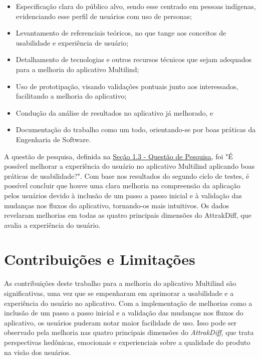     \begin{itemize}
              \item Especificação clara do público alvo, sendo esse centrado em pessoas indígenas, evidenciando esse perfil de usuários com uso de personas;

              \item Levantamento de referenciais teóricos, no que tange aos conceitos de usabilidade e experiência de usuário;

              \item Detalhamento de tecnologias e outros recursos técnicos que sejam adequados para a melhoria do aplicativo Multilind;

              \item Uso de prototipação, visando validações pontuais junto aos interessados, facilitando a melhoria do aplicativo;

              \item Condução da análise de resultados no aplicativo já melhorado, e
              
              \item Documentação do trabalho como um todo, orientando-se por boas práticas da Engenharia de Software.
    \end{itemize}

A questão de pesquisa, definida na \hyperref[sec:QuestaodePesquisa]{Seção 1.3 - Questão de Pesquisa}, foi "É possível melhorar a experiência do usuário no aplicativo 
Multilind aplicando boas práticas de usabilidade?". Com base nos resultados do segundo ciclo de testes, é possível concluir que houve uma clara melhoria na compreensão da aplicação 
pelos usuários devido à inclusão de um passo a passo inicial e à validação das mudanças nos fluxos do aplicativo, tornando-os mais intuitivos. Os dados revelaram melhorias em todas 
as quatro principais dimensões do AttrakDiff, que avalia a experiência do usuário.

\section{Contribuições e Limitações}
\label{sec:Contribuições e Limitações}

As contribuições deste trabalho para a melhoria do aplicativo Multilind são significativas, uma vez que se empenharam em aprimorar a usabilidade e a experiência do usuário no aplicativo. 
Com a implementação de melhorias como a inclusão de um passo a passo inicial e a validação das mudanças nos fluxos do aplicativo, os usuários puderam notar maior facilidade de uso. 
Isso pode ser observado pela melhoria nas quatro principais dimensões do \textit{AttrakDiff}, que trata perspectivas hedônicas, emocionais e experienciais sobre a qualidade do produto na visão 
dos usuários.

